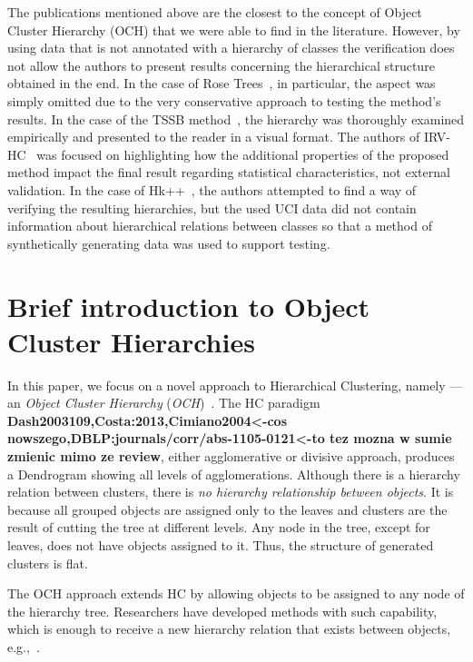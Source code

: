 \documentclass{article}
\begin{document}
The publications mentioned above are the closest to the concept of Object Cluster Hierarchy (OCH) that we were able to find in the literature. However, by using data that is not annotated with a hierarchy of classes the verification does not allow the authors to present results concerning the hierarchical structure obtained in the end. In the case of Rose Trees~\cite{2010_bayesian_rose_trees}, in particular, the aspect was simply omitted due to the very conservative approach to testing the method's results. In the case of the TSSB method~\cite{ghahramani2010tree}, the hierarchy was thoroughly examined empirically and presented to the reader in a visual format. The authors of IRV-HC~\cite{Spytkowski2012} was focused on highlighting how the additional properties of the proposed method impact the final result regarding statistical characteristics, not external validation. In the case of Hk++~\cite{Olech2016}, the authors attempted to find a way of verifying the resulting hierarchies, but the used UCI data did not contain information about hierarchical relations between classes so that a method of synthetically generating data was used to support testing.

\section{Brief introduction to Object Cluster Hierarchies}
\label{sec:intro_to_och}
In this paper, we focus on a novel approach to Hierarchical Clustering, namely --- an \textit{Object Cluster Hierarchy} (\textit{OCH})~\cite{Spytkowski2012,Olech2016}. The HC paradigm \textbf{Dash2003109,Costa:2013,Cimiano2004<-cos nowszego,DBLP:journals/corr/abs-1105-0121<-to tez mozna w sumie zmienic mimo ze review}, either agglomerative or divisive approach, produces a Dendrogram showing all levels of agglomerations. Although there is a hierarchy relation between clusters, there is \textit{no hierarchy relationship between objects}. It is because all grouped objects are assigned only to the leaves and clusters are the result of cutting the tree at different levels. Any node in the tree, except for leaves, does not have objects assigned to it. Thus, the structure of generated clusters is flat. 


    
The OCH approach extends HC by allowing objects to be assigned to any node of the hierarchy tree. Researchers have developed methods with such capability, which is enough to receive a new hierarchy relation that exists between objects, e.g.,~\cite{ghahramani2010tree,2010_bayesian_rose_trees,Spytkowski2012,Olech2016}.
\end{document}

